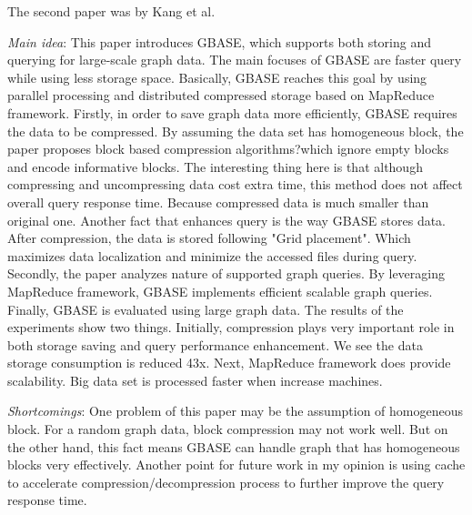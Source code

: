 The second paper was by Kang et al.
\cite{Daubechies92Ten}
\begin{itemize*}
\item {\em Main idea}: This paper introduces GBASE, which supports both storing and querying for large-scale graph data. The main focuses of GBASE are faster query while using less storage space. Basically, GBASE reaches this goal by using parallel processing and distributed compressed storage based on MapReduce framework.
Firstly, in order to save graph data more efficiently, GBASE requires the data to be compressed. By assuming the data set has homogeneous block, the paper proposes block based compression algorithms?which ignore empty blocks and encode informative blocks. The interesting thing here is that although compressing and uncompressing data cost extra time, this method does not affect overall query response time. Because compressed data is much smaller than original one. Another fact that enhances query is the way GBASE stores data. After compression, the data is stored following "Grid placement". Which maximizes data localization and minimize the accessed files during query.
Secondly, the paper analyzes nature of supported graph queries. By leveraging MapReduce framework, GBASE implements efficient scalable graph queries.
Finally, GBASE is evaluated using large graph data. The results of the experiments show two things. Initially, compression plays very important role in both storage saving and query performance enhancement. We see the data storage consumption is reduced 43x. Next, MapReduce framework does provide scalability. Big data set is processed faster when increase machines.
\item {\em Shortcomings}:
	One problem of this paper may be the assumption of homogeneous block. For a random graph data, block compression may not work well. But on the other hand, this fact means GBASE can handle graph that has homogeneous blocks very effectively.
	Another point for future work in my opinion is using cache to accelerate compression/decompression process to further improve the query response time.
\end{itemize*}


